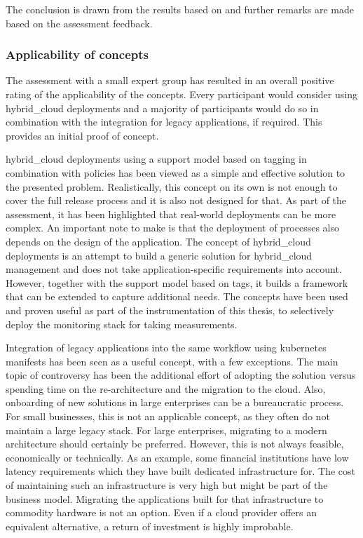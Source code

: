 \documentclass[../main.tex]{subfiles}
\begin{document}
    The conclusion is drawn from the results based on  and further remarks are made based on the assessment feedback.

    \subsubsection{Applicability of concepts}

    The assessment with a small expert group has resulted in an overall positive rating of the applicability of the concepts.
    Every participant would consider using \gls{hybrid_cloud} deployments and a majority of participants would do so in combination with the integration for legacy applications, if required.
    This provides an initial proof of concept.

    \Gls{hybrid_cloud} deployments using a support model based on tagging in combination with policies has been viewed as a simple and effective solution to the presented problem.
    Realistically, this concept on its own is not enough to cover the full release process and it is also not designed for that.
    As part of the assessment, it has been highlighted that real-world deployments can be more complex.
    An important note to make is that the deployment of processes also depends on the design of the application.
    The concept of \gls{hybrid_cloud} deployments is an attempt to build a generic solution for \gls{hybrid_cloud} management and does not take application-specific requirements into account.
    However, together with the support model based on tags, it builds a framework that can be extended to capture additional needs.
    The concepts have been used and proven useful as part of the instrumentation of this thesis, to selectively deploy the monitoring stack for taking measurements.

    Integration of legacy applications into the same workflow using \gls{kubernetes} manifests has been seen as a useful concept, with a few exceptions.
    The main topic of controversy has been the additional effort of adopting the solution versus spending time on the re-architecture and the migration to the \gls{cloud}.
    Also, onboarding of new solutions in large enterprises can be a bureaucratic process.
    For small businesses, this is not an applicable concept, as they often do not maintain a large legacy stack.
    For large enterprises, migrating to a modern architecture should certainly be preferred.
    However, this is not always feasible, economically or technically.
    As an example, some financial institutions have low latency requirements which they have built dedicated infrastructure for.
    The cost of maintaining such an infrastructure is very high but might be part of the business model.
    Migrating the applications built for that infrastructure to commodity hardware is not an option.
    Even if a \gls{cloud} provider offers an equivalent alternative, a return of investment is highly improbable.
\end{document}
